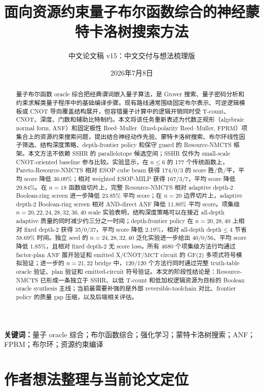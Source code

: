 \documentclass[UTF8,fontset=macnew,11pt]{ctexart}
\title{面向资源约束量子布尔函数综合的神经蒙特卡洛树搜索方法}
\author{中文论文稿 v15：中文交付与想法梳理版}
\date{2026年7月8日}
\newcommand{\method}{Resource-NMCTS}
\newcommand{\screen}{Boolean-ring screen}
\newcommand{\anf}{\ensuremath{\mathrm{ANF}}}
\newcommand{\fprm}{\ensuremath{\mathrm{FPRM}}}
\newcommand{\ttable}{truth-table}
\newcommand{\mct}{\ensuremath{\mathrm{MCT}}}
\begin{document}
\pagestyle{plain}
\maketitle

\begin{abstract}
量子布尔函数 oracle 综合把经典谓词嵌入量子算法，是 Grover 搜索、量子密码分析和约束求解类量子程序中的基础编译步骤。现有路线通常围绕固定布尔表示、可逆逻辑模板或 CNOT 导向覆盖结构展开，但容错量子计算中的逻辑开销同时受 T-count、CNOT、深度、门数和辅助比特制约。本文将该任务重新表述为代数正规形（algebraic normal form, \anf{}）和固定极性 Reed--Muller（fixed-polarity Reed--Muller, \fprm{}）项集合上的资源约束搜索问题，提出结合神经动作先验、蒙特卡洛树搜索、布尔环线性因子筛选、结构深度策略、depth-frontier policy 和保守 guard 的 \method{} 框架。本文方法不依赖 SSHR 的 parallelotope 候选空间；SSHR 仅作为 small-scale CNOT-oriented baseline 参与比较。实验显示，在 $n\leq6$ 的 177 个传统函数上，Pareto-\method{} 相对 ESOP cube beam 获得 174/0/3 的 score 胜/负/平，平均 score 降低 36.09\%；相对 weighted ESOP-MILP 获得 167/3/7，平均 score 降低 29.84\%。在 $n=18$ 函数级切片上，完整 \method{} 相对 adaptive depth-2 \screen{} 进一步降低 23.85\% 平均 score；在 $n=20$ 边界切片上，adaptive depth-2 \screen{} 相对 AND-direct ANF 降低 11.80\% 平均 score。项集级 $n=20,22,24,28,32,36,40$ scale 实验表明，结构深度策略可以在接近 all-depth adaptive 质量的同时减少约三分之一时间；depth-frontier policy 在 $n=20,28,40$ 上相对 fixed depth-2 获得 35/0/37，平均 score 降低 2.19\%，相对 all-depth depth$\leq4$ 节省 58.69\% 时间。独立 seed 的 $n=24,28,32,40$ 泛化实验进一步给出 40/0/56、平均 score 降低 1.85\%，且相对 fixed depth-2 无 score loss。所有 4680 个项集级方法行均通过 factor-plan \anf{} 展开验证和 emitted X/CNOT/\mct{} circuit 的 GF(2) 多项式符号模拟验证；进一步的 $n=21,22$ bridge 中，120/120 个方法行同时通过完整 \ttable{} oracle 验证、plan 验证和 emitted-circuit 符号验证。本文的阶段性结论是：\method{} 已形成一条独立于 SSHR、以低 T-count 和低加权逻辑资源为目标的 Boolean oracle synthesis 主线；当前最需要补强的是外部 reversible-toolchain 对比、frontier policy 的质量 gap 压缩，以及后端相关评估。
\end{abstract}

\noindent\textbf{关键词：}量子 oracle 综合；布尔函数综合；强化学习；蒙特卡洛树搜索；ANF；FPRM；布尔环；资源约束编译

\section*{作者想法整理与当前论文定位}
\end{document}
